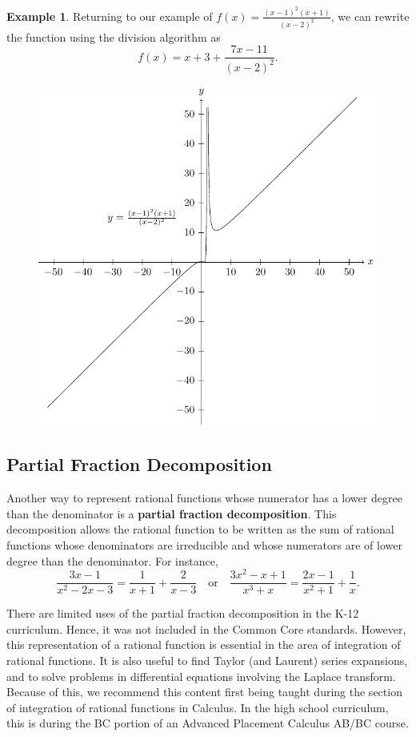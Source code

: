 \documentclass[
]{book}
\theoremstyle{definition}
\theoremstyle{definition}
\newtheorem{example}{Example}[chapter]
\theoremstyle{definition}
\theoremstyle{remark}
\begin{document}
\begin{example}
\protect\hypertarget{exm:unnamed-chunk-232}{}{\label{exm:unnamed-chunk-232} }Returning to our example of \(f(x)=\frac{(x-1)^2(x+1)}{(x-2)^2}\), we can rewrite the function using the division algorithm as
\[f(x)= x+3 + \frac{7x-11}{(x-2)^2}.\]
\end{example}
\begin{figure}

{\centering \includegraphics[width=0.5\linewidth]{tikz/rational5} 

}

\end{figure}

\hypertarget{partial-fraction-decomposition}{%
\subsection{Partial Fraction Decomposition}\label{partial-fraction-decomposition}}

Another way to represent rational functions whose numerator has a lower degree than the denominator is a \textbf{partial fraction decomposition}. This decomposition allows the rational function to be written as the sum of rational functions whose denominators are irreducible and whose numerators are of lower degree than the denominator. For instance,
\[\frac{3x-1}{x^2-2x-3} = \frac{1}{x+1} + \frac{2}{x-3}\quad \mbox{or} \quad \frac{3x^2-x+1}{x^3+x} = \frac{2x-1}{x^2+1} + \frac{1}{x}.\]

There are limited uses of the partial fraction decomposition in the K-12 curriculum. Hence, it was not included in the Common Core standards. However, this representation of a rational function is essential in the area of integration of rational functions. It is also useful to find Taylor (and Laurent) series expansions, and to solve problems in differential equations involving the Laplace transform. Because of this, we recommend this content first being taught during the section of integration of rational functions in Calculus. In the high school curriculum, this is during the BC portion of an Advanced Placement Calculus AB/BC course.
\end{document}
